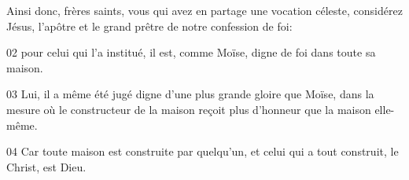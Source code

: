 Ainsi donc, frères saints, vous qui avez en partage une vocation céleste, considérez Jésus, l’apôtre et le grand prêtre de notre confession de foi:

02 pour celui qui l’a institué, il est, comme Moïse, digne de foi dans toute sa maison.

03 Lui, il a même été jugé digne d’une plus grande gloire que Moïse, dans la mesure où le constructeur de la maison reçoit plus d’honneur que la maison elle-même.

04 Car toute maison est construite par quelqu’un, et celui qui a tout construit, le Christ, est Dieu.
